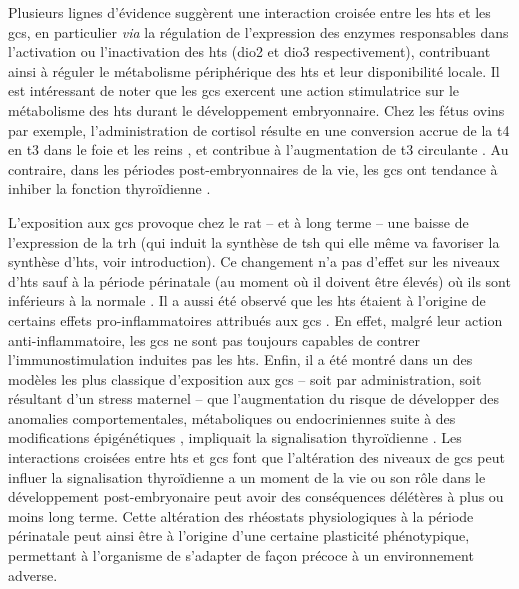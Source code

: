 \documentclass[../main.tex]{subfiles}
\begin{document}
Plusieurs lignes d'évidence suggèrent une interaction croisée entre les \glspl{ht} et les \glspl{gc}, en particulier \textit{via} la régulation de l'expression des enzymes responsables dans l'activation ou l'inactivation des \glspl{ht} (\gls{dio2} et \gls{dio3} respectivement), contribuant ainsi à réguler le métabolisme périphérique des \glspl{ht} et leur disponibilité locale.
Il est intéressant de noter que les \glspl{gc} exercent une action stimulatrice sur le métabolisme des \glspl{ht} durant le développement embryonnaire.
Chez les fétus ovins par exemple, l'administration de cortisol résulte en une conversion accrue de la \gls{t4} en \gls{t3} dans le foie et les reins \citep{Wu1978}, et contribue à l'augmentation de \gls{t3} circulante \citep{Darras1996}.
Au contraire, dans les périodes post-embryonnaires de la vie, les \glspl{gc} ont tendance à inhiber la fonction thyroïdienne \citep{Chopra1975,Decuypere1983,Bianco1987}.
\par
L'exposition aux \glspl{gc} provoque chez le rat – et à long terme – une baisse de l'expression de la \gls{trh} (qui induit la synthèse de \gls{tsh} qui elle même va favoriser la synthèse d'\glspl{ht}, voir introduction).
Ce changement n'a pas d'effet sur les niveaux d'\glspl{ht} sauf à la période périnatale (au moment où il doivent être élevés) où ils sont inférieurs à la normale \citep{Carbone2012}.
Il a aussi été observé que les \glspl{ht} étaient à l'origine de certains effets pro-inflammatoires attribués aux \glspl{gc} \citep{Montesinos2012}.
En effet, malgré leur action anti-inflammatoire, les \glspl{gc} ne sont pas toujours capables de contrer l'immunostimulation induites pas les \glspl{ht}.
Enfin, il a été montré dans un des modèles les plus classique d'exposition aux \glspl{gc} – soit par administration, soit résultant d'un stress maternel – que l'augmentation du risque de développer des anomalies comportementales, métaboliques ou endocriniennes suite à des modifications épigénétiques \cite{Weaver2004}, impliquait la signalisation thyroïdienne \citep{Hellstrom2012}.
Les interactions croisées entre \glspl{ht} et \glspl{gc} font que l'altération des niveaux de \glspl{gc} peut influer la signalisation thyroïdienne a un moment de la vie ou son rôle dans le développement post-embryonaire peut avoir des conséquences délétères à plus ou moins long terme.
Cette altération des rhéostats physiologiques à la période périnatale peut ainsi être à l'origine d'une certaine plasticité phénotypique, permettant à l'organisme de s'adapter de façon précoce à un environnement adverse.
\par
\end{document}
